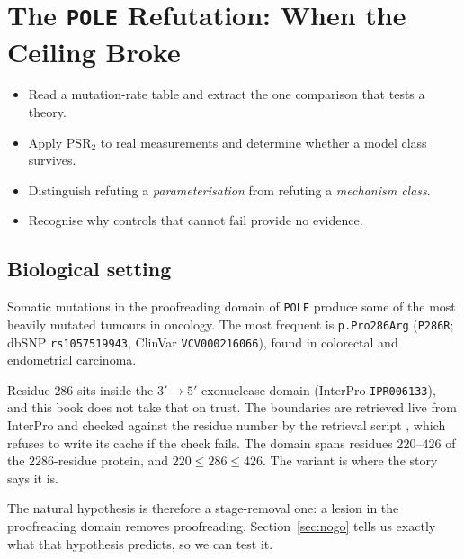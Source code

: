 \section{The \texttt{POLE} Refutation: When the Ceiling Broke}\label{sec:refutation}

\begin{objectives}
\begin{itemize}[leftmargin=*,itemsep=1pt,topsep=1pt]
  \item Read a mutation-rate table and extract the one comparison that tests a theory.
  \item Apply PSR$_2$ to real measurements and determine whether a model class survives.
  \item Distinguish refuting a \emph{parameterisation} from refuting a \emph{mechanism class}.
  \item Recognise why controls that cannot fail provide no evidence.
\end{itemize}
\end{objectives}

\subsection{Biological setting}

Somatic mutations in the proofreading domain of \texttt{POLE} produce some of the
most heavily mutated tumours in oncology. The most frequent is
\texttt{p.Pro286Arg} (\texttt{P286R}; dbSNP \texttt{rs1057519943}, ClinVar
\texttt{VCV000216066}), found in colorectal and endometrial carcinoma.

Residue $286$ sits inside the $3'\!\to\!5'$ exonuclease domain
(InterPro \texttt{IPR006133}), and this book does not take that on trust.
The boundaries are
retrieved live from InterPro and checked against the residue number by the
retrieval script , which refuses
to write its cache if the check fails. The domain spans residues $220$--$426$ of
the $2286$-residue protein, and $220 \le 286 \le 426$. The variant is where the
story says it is.

The natural hypothesis is therefore a stage-removal one: a lesion in the
proofreading domain removes proofreading. Section~\ref{sec:nogo} tells us exactly
what that hypothesis predicts, so we can test it.

